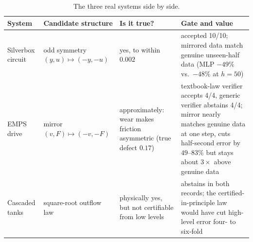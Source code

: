 \begin{table}[h]
\centering\small
\caption{The three real systems side by side.}
\label{tab:realsynth}
\setlength{\tabcolsep}{3.5pt}
\begin{tabular}{>{\raggedright\arraybackslash}p{2.3cm}>{\raggedright\arraybackslash}p{2.9cm}>{\raggedright\arraybackslash}p{3.2cm}>{\raggedright\arraybackslash}p{5.2cm}}
\toprule
System & Candidate structure & Is it true? & Gate and value\\
\midrule
Silverbox circuit & odd symmetry $(y,u)\mapsto(-y,-u)$ & yes, to within $0.002$ & accepted 10/10; mirrored data match genuine unseen-half data (MLP $-49\%$ vs.\ $-48\%$ at $h=50$)\\
EMPS drive & mirror $(v,F)\mapsto(-v,-F)$ & approximately: wear makes friction asymmetric (true defect $0.17$) & textbook-law verifier accepts 4/4, generic verifier abstains 4/4; mirror nearly matches genuine data at one step, cuts half-second error by $49$--$83\%$ but stays about $3\times$ above genuine data\\
Cascaded tanks & square-root outflow law & physically yes, but not certifiable from low levels & abstains in both records; the certified-in-principle law would have cut high-level error four- to six-fold\\
\bottomrule
\end{tabular}
\end{table}

